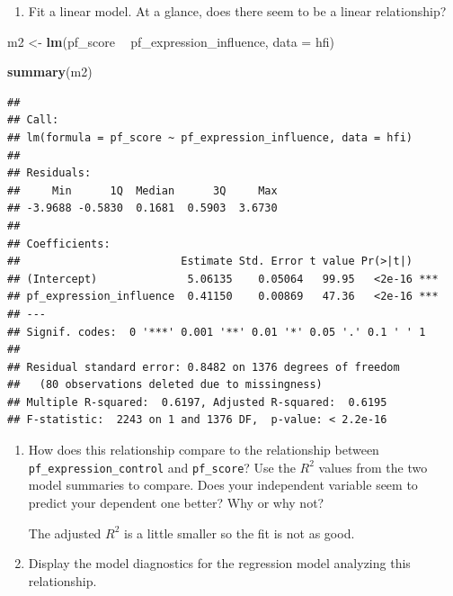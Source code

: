 \documentclass[
]{book}
\newenvironment{Shaded}{\begin{snugshade}}{\end{snugshade}}
\newcommand{\DataTypeTok}[1]{\textcolor[rgb]{0.13,0.29,0.53}{#1}}
\newcommand{\KeywordTok}[1]{\textcolor[rgb]{0.13,0.29,0.53}{\textbf{#1}}}
\newcommand{\NormalTok}[1]{#1}
\newcommand{\OperatorTok}[1]{\textcolor[rgb]{0.81,0.36,0.00}{\textbf{#1}}}
\newcommand{\StringTok}[1]{\textcolor[rgb]{0.31,0.60,0.02}{#1}}
\providecommand{\tightlist}{%
  \setlength{\itemsep}{0pt}\setlength{\parskip}{0pt}}
\begin{document}
\begin{enumerate}
\def\labelenumi{\alph{enumi}.}
\setcounter{enumi}{2}
\tightlist
\item
  Fit a linear model. At a glance, does there seem to be a linear relationship?
\end{enumerate}

\begin{Shaded}
\begin{Highlighting}[]
\NormalTok{m2 <-}\StringTok{ }\KeywordTok{lm}\NormalTok{(pf_score }\OperatorTok{~}\StringTok{ }\NormalTok{pf_expression_influence, }\DataTypeTok{data =}\NormalTok{ hfi)}
\end{Highlighting}
\end{Shaded}

\begin{Shaded}
\begin{Highlighting}[]
\KeywordTok{summary}\NormalTok{(m2)}
\end{Highlighting}
\end{Shaded}

\begin{verbatim}
## 
## Call:
## lm(formula = pf_score ~ pf_expression_influence, data = hfi)
## 
## Residuals:
##     Min      1Q  Median      3Q     Max 
## -3.9688 -0.5830  0.1681  0.5903  3.6730 
## 
## Coefficients:
##                         Estimate Std. Error t value Pr(>|t|)    
## (Intercept)              5.06135    0.05064   99.95   <2e-16 ***
## pf_expression_influence  0.41150    0.00869   47.36   <2e-16 ***
## ---
## Signif. codes:  0 '***' 0.001 '**' 0.01 '*' 0.05 '.' 0.1 ' ' 1
## 
## Residual standard error: 0.8482 on 1376 degrees of freedom
##   (80 observations deleted due to missingness)
## Multiple R-squared:  0.6197, Adjusted R-squared:  0.6195 
## F-statistic:  2243 on 1 and 1376 DF,  p-value: < 2.2e-16
\end{verbatim}

\begin{enumerate}
\def\labelenumi{\alph{enumi}.}
\setcounter{enumi}{3}
\item
  How does this relationship compare to the relationship between
  \texttt{pf\_expression\_control} and \texttt{pf\_score}? Use the \(R^2\) values from the two
  model summaries to compare. Does your independent variable seem to predict
  your dependent one better? Why or why not?

  The adjusted \(R^2\) is a little smaller so the fit is not as good.
\item
  Display the model diagnostics for the regression model analyzing this relationship.
\end{enumerate}
\end{document}
